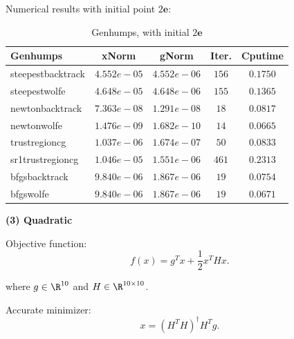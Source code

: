 \documentclass[11pt]{report}
\begin{document}
Numerical results with initial point $2\mathbf{e}$:
\begin{table}[htpb]
    \caption{Genhumps, with initial $2\mathbf{e}$}
    \label{tab:Genhumps_initial}
    \begin{center}
        \begin{tabular}{l|cccc}
\textbf{Genhumps}           &   \textbf{xNorm}     &\textbf{gNorm}     & \textbf{Iter.}&  \textbf{Cputime}   \\
\hline
steepestbacktrack   &   $4.552e-05 $&   $4.552e-06 $&   $156  $&    $0.1750    $    \\
steepestwolfe       &   $4.648e-05 $&   $4.648e-06 $&   $155  $&    $0.1365    $    \\
newtonbacktrack     &   $7.363e-08 $&   $1.291e-08 $&   $18   $&    $0.0817    $    \\
newtonwolfe         &   $1.476e-09 $&   $1.682e-10 $&   $14   $&    $0.0665    $    \\
trustregioncg       &   $1.037e-06 $&   $1.674e-07 $&   $50   $&    $0.0833    $    \\
sr1trustregioncg    &   $1.046e-05 $&   $1.551e-06 $&   $461  $&    $0.2313    $    \\
bfgsbacktrack       &   $9.840e-06 $&   $1.867e-06 $&   $19   $&    $0.0754    $    \\
bfgswolfe           &   $9.840e-06 $&   $1.867e-06 $&   $19   $&    $0.0671    $    \\   
 \end{tabular}
    \end{center}
\end{table}

\textbf{(3) Quadratic }

Objective function: 
\begin{equation}
    f(x) = g^Tx+\frac{1}{2}x^THx.
\end{equation}

where $g\in\R^{10}$ and $H\in \R^{10\times10}$.

Accurate minimizer:
\begin{equation}
    x = (H^TH)^{\dagger}H^Tg.
\end{equation}
\end{document}
